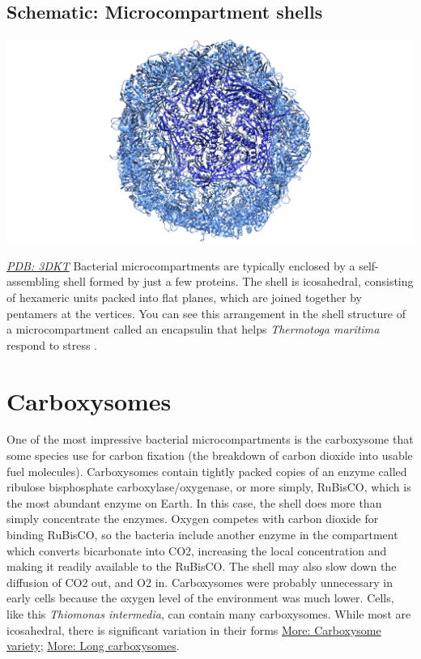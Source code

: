 \documentclass[]{tufte-book}
\begin{document}
\hypertarget{Microcompartment_shells}{\subsection*{Schematic:
Microcompartment shells}\label{Microcompartment_shells}}

\includegraphics{img/schematics/4_6_1}

\href{http://rcsb.org/structure/3DKT}{\emph{PDB: 3DKT}} Bacterial
microcompartments are typically enclosed by a self-assembling shell
formed by just a few proteins. The shell is icosahedral, consisting of
hexameric units packed into flat planes, which are joined together by
pentamers at the vertices. You can see this arrangement in the shell
structure of a microcompartment called an encapsulin that helps
\emph{Thermotoga maritima} respond to stress \citep{sutter2008}.

\section{Carboxysomes}\label{carboxysomes}

One of the most impressive bacterial microcompartments is the
carboxysome that some species use for carbon fixation (the breakdown of
carbon dioxide into usable fuel molecules). Carboxysomes contain tightly
packed copies of an enzyme called ribulose bisphosphate
carboxylase/oxygenase, or more simply, RuBisCO, which is the most
abundant enzyme on Earth. In this case, the shell does more than simply
concentrate the enzymes. Oxygen competes with carbon dioxide for binding
RuBisCO, so the bacteria include another enzyme in the compartment which
converts bicarbonate into CO2, increasing the local concentration and
making it readily available to the RuBisCO. The shell may also slow down
the diffusion of CO2 out, and O2 in. Carboxysomes were probably
unnecessary in early cells because the oxygen level of the environment
was much lower. Cells, like this \emph{Thiomonas intermedia}, can
contain many carboxysomes. While most are icosahedral, there is
significant variation in their forms
\protect\hyperlink{Carboxysome_variety}{More: Carboxysome variety};
\protect\hyperlink{Long_carboxysomes}{More: Long carboxysomes}.
\end{document}
